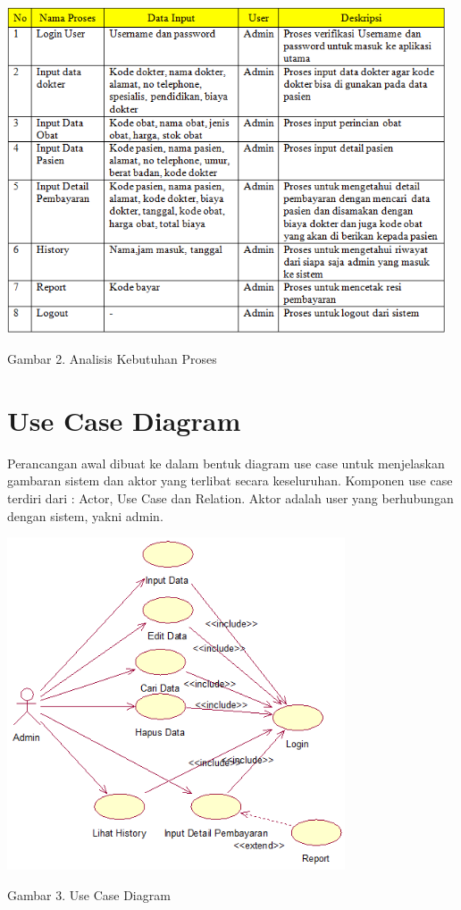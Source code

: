\documentclass{jtetiproposalskripsi}
\begin{document}
\begin{center}
\includegraphics[width=13cm]{gambar/KebutuhanProses.png} 

Gambar 2. Analisis Kebutuhan Proses
\end{center}

\section{Use Case Diagram}
Perancangan awal dibuat ke dalam bentuk diagram use case untuk menjelaskan gambaran sistem dan aktor yang terlibat secara keseluruhan. Komponen use case terdiri dari : Actor, Use Case dan Relation. Aktor adalah user yang berhubungan dengan sistem, yakni admin.

\begin{center}
\includegraphics[width=10cm]{gambar/UseCase.png}

Gambar 3. Use Case Diagram
\end{center}
\end{document}
